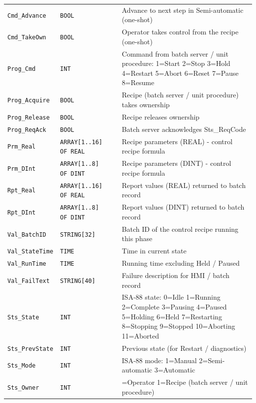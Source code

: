 {\begin{longtable}{@{}>{\raggedright\arraybackslash}p{3.4cm}>{\raggedright\arraybackslash}p{3.3cm}>{\raggedright\arraybackslash}p{1.3cm}>{\raggedright\arraybackslash}p{6.4cm}@{}}
\texttt{Cmd\_Advance} & \texttt{BOOL} &  & Advance to next step in Semi-automatic (one-shot) \\
\texttt{Cmd\_TakeOwn} & \texttt{BOOL} &  & Operator takes control from the recipe (one-shot) \\
\texttt{Prog\_Cmd} & \texttt{INT} &  & Command from batch server /\allowbreak{} unit procedure: 1=Start 2=Stop 3=Hold 4=Restart 5=Abort 6=Reset 7=Pause 8=Resume \\
\texttt{Prog\_Acquire} & \texttt{BOOL} &  & Recipe (batch server /\allowbreak{} unit procedure) takes ownership \\
\texttt{Prog\_Release} & \texttt{BOOL} &  & Recipe releases ownership \\
\texttt{Prog\_ReqAck} & \texttt{BOOL} &  & Batch server acknowledges Sts\_ReqCode \\
\texttt{Prm\_Real} & \texttt{ARRAY[1..16] OF REAL} &  & Recipe parameters (REAL) - control recipe formula \\
\texttt{Prm\_DInt} & \texttt{ARRAY[1..8] OF DINT} &  & Recipe parameters (DINT) - control recipe formula \\
\texttt{Rpt\_Real} & \texttt{ARRAY[1..16] OF REAL} &  & Report values (REAL) returned to batch record \\
\texttt{Rpt\_DInt} & \texttt{ARRAY[1..8] OF DINT} &  & Report values (DINT) returned to batch record \\
\texttt{Val\_BatchID} & \texttt{STRING[32]} &  & Batch ID of the control recipe running this phase \\
\texttt{Val\_StateTime} & \texttt{TIME} &  & Time in current state \\
\texttt{Val\_RunTime} & \texttt{TIME} &  & Running time excluding Held /\allowbreak{} Paused \\
\texttt{Val\_FailText} & \texttt{STRING[40]} &  & Failure description for HMI /\allowbreak{} batch record \\
\texttt{Sts\_State} & \texttt{INT} &  & ISA-88 state: 0=Idle 1=Running 2=Complete 3=Pausing 4=Paused 5=Holding 6=Held 7=Restarting 8=Stopping 9=Stopped 10=Aborting 11=Aborted \\
\texttt{Sts\_PrevState} & \texttt{INT} &  & Previous state (for Restart /\allowbreak{} diagnostics) \\
\texttt{Sts\_Mode} & \texttt{INT} &  & ISA-88 mode: 1=Manual 2=Semi-automatic 3=Automatic \\
\texttt{Sts\_Owner} & \texttt{INT} &  & 0=Operator 1=Recipe (batch server /\allowbreak{} unit procedure) \\

\end{longtable}}
